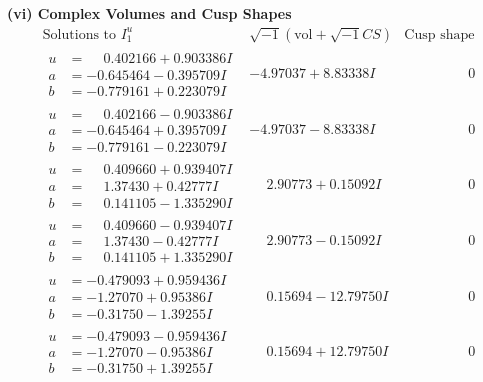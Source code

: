 \documentclass[1p]{elsarticle_modified}
\theoremstyle{definition}
\newcommand{\I}{\sqrt{-1}}
\begin{document}
\newpage\flushleft \textbf{(vi) Complex Volumes and Cusp Shapes}
$$\begin{array}{c|c|c}  
\text{Solutions to }I^u_{1}& \I (\text{vol} + \sqrt{-1}CS) & \text{Cusp shape}\\
 \hline 
\begin{aligned}
u &= \phantom{-}0.402166 + 0.903386 I \\
a &= -0.645464 - 0.395709 I \\
b &= -0.779161 + 0.223079 I\end{aligned}
 & -4.97037 + 8.83338 I & \phantom{-0.000000 } 0 \\ \hline\begin{aligned}
u &= \phantom{-}0.402166 - 0.903386 I \\
a &= -0.645464 + 0.395709 I \\
b &= -0.779161 - 0.223079 I\end{aligned}
 & -4.97037 - 8.83338 I & \phantom{-0.000000 } 0 \\ \hline\begin{aligned}
u &= \phantom{-}0.409660 + 0.939407 I \\
a &= \phantom{-}1.37430 + 0.42777 I \\
b &= \phantom{-}0.141105 - 1.335290 I\end{aligned}
 & \phantom{-}2.90773 + 0.15092 I & \phantom{-0.000000 } 0 \\ \hline\begin{aligned}
u &= \phantom{-}0.409660 - 0.939407 I \\
a &= \phantom{-}1.37430 - 0.42777 I \\
b &= \phantom{-}0.141105 + 1.335290 I\end{aligned}
 & \phantom{-}2.90773 - 0.15092 I & \phantom{-0.000000 } 0 \\ \hline\begin{aligned}
u &= -0.479093 + 0.959436 I \\
a &= -1.27070 + 0.95386 I \\
b &= -0.31750 - 1.39255 I\end{aligned}
 & \phantom{-}0.15694 - 12.79750 I & \phantom{-0.000000 } 0 \\ \hline\begin{aligned}
u &= -0.479093 - 0.959436 I \\
a &= -1.27070 - 0.95386 I \\
b &= -0.31750 + 1.39255 I\end{aligned}
 & \phantom{-}0.15694 + 12.79750 I & \phantom{-0.000000 } 0 \\ \hline\begin{aligned}

\end{aligned}
\end{array}$$
\end{document}
